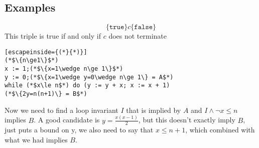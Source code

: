 \documentclass{article}
\begin{document}
\subsection{Examples}
$$\{\texttt{true}\}c\{\texttt{false}\}$$
This triple is true if and only if $ c $ does not terminate
\begin{lstlisting}[escapeinside={(*}{*)}]
(*$\{n\ge1\}$*)
x := 1;(*$\{x=1\wedge n\ge 1\}$*)
y := 0;(*$\{x=1\wedge y=0\wedge n\ge 1\} = A$*)
while (*$x\le n$*) do (y := y + x; x := x + 1)
(*$\{2y=n(n+1)\} = B$*)
\end{lstlisting}
Now we need to find a loop invariant $I$ that is implied by $A$ and $I\wedge \neg x\le n$ implies $ B $.
A good candidate is $ y=\frac{x(x-1)}{2} $, but this doesn't exactly imply $ B $, just puts a bound on y, we also need to say that $ x\le n+1 $, which combined with what we had implies $ B $.
\end{document}

